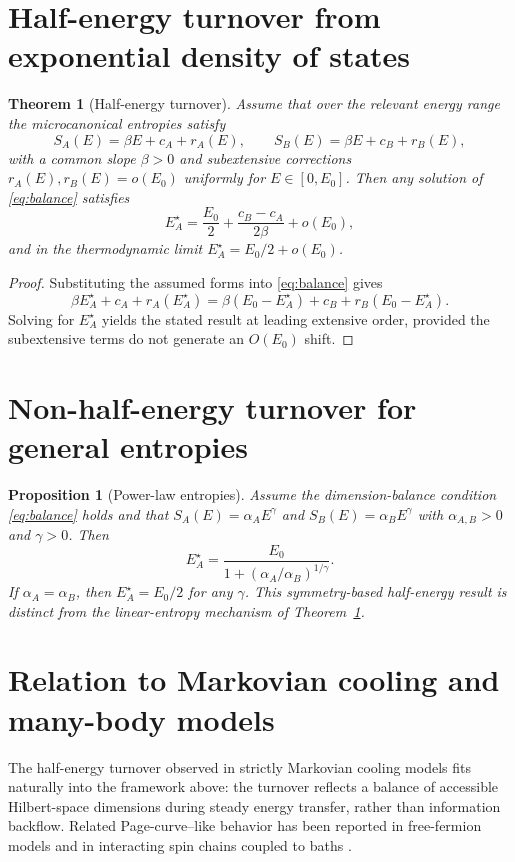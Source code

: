 \documentclass[11pt]{article}
\newtheorem{theorem}{Theorem}
\newtheorem{proposition}{Proposition}
\begin{document}
\section{Half-energy turnover from exponential density of states}

\begin{theorem}[Half-energy turnover]
\label{thm:half_energy}
Assume that over the relevant energy range the microcanonical entropies satisfy
\[
S_A(E)=\beta E + c_A + r_A(E), \qquad
S_B(E)=\beta E + c_B + r_B(E),
\]
with a common slope $\beta>0$ and subextensive corrections
$r_A(E),r_B(E)=o(E_0)$ uniformly for $E\in[0,E_0]$.
Then any solution of \eqref{eq:balance} satisfies
\[
E_A^\star = \frac{E_0}{2} + \frac{c_B-c_A}{2\beta} + o(E_0),
\]
and in the thermodynamic limit $E_A^\star=E_0/2+o(E_0)$.
\end{theorem}

\begin{proof}
Substituting the assumed forms into \eqref{eq:balance} gives
\[
\beta E_A^\star + c_A + r_A(E_A^\star)
=
\beta(E_0-E_A^\star) + c_B + r_B(E_0-E_A^\star).
\]
Solving for $E_A^\star$ yields the stated result at leading extensive order, provided
the subextensive terms do not generate an $O(E_0)$ shift.
\end{proof}

\section{Non-half-energy turnover for general entropies}

\begin{proposition}[Power-law entropies]
\label{prop:powerlaw}
Assume the dimension-balance condition \eqref{eq:balance} holds and that
$S_A(E)=\alpha_A E^\gamma$ and $S_B(E)=\alpha_B E^\gamma$ with
$\alpha_{A,B}>0$ and $\gamma>0$.
Then
\[
E_A^\star = \frac{E_0}{1+(\alpha_A/\alpha_B)^{1/\gamma}}.
\]
If $\alpha_A=\alpha_B$, then $E_A^\star=E_0/2$ for any $\gamma$.
This symmetry-based half-energy result is distinct from the linear-entropy mechanism
of Theorem~\ref{thm:half_energy}.
\end{proposition}

\section{Relation to Markovian cooling and many-body models}

The half-energy turnover observed in strictly Markovian cooling models
\cite{Glatthard2025} fits naturally into the framework above: the turnover reflects a
balance of accessible Hilbert-space dimensions during steady energy transfer, rather
than information backflow.
Related Page-curve--like behavior has been reported in free-fermion models
\cite{Kehrein2024} and in interacting spin chains coupled to baths
\cite{RayDharKulkarni2025}.
\end{document}
